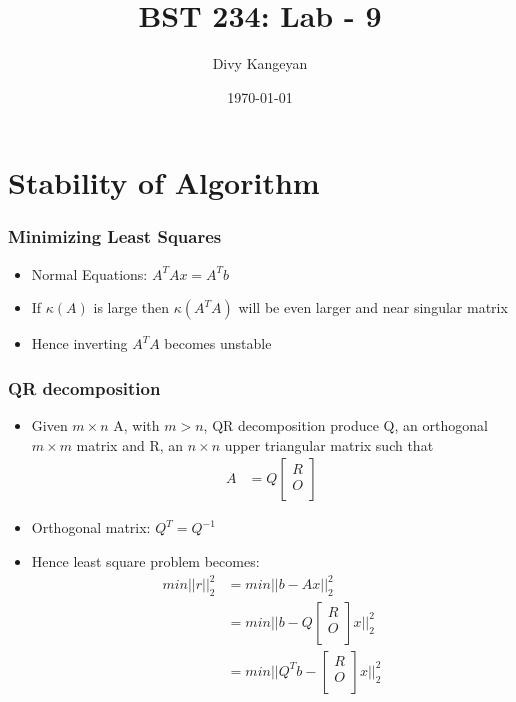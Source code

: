 \documentclass{beamer}
\title[BST 234]{BST 234: Lab - 9}
\author[Divy Kangeyan]{Divy Kangeyan}
\date{\today}
\begin{document}
	
	\begin{frame}
		\titlepage
	\end{frame}
	
	
\section{Stability of Algorithm}




\begin{frame}
\frametitle{Minimizing Least Squares}

\begin{itemize}
\item Normal Equations: $A^TAx = A^Tb$
\item If $\kappa(A)$ is large then $\kappa(A^TA)$ will be even larger and near singular matrix
\item Hence inverting $A^TA$ becomes unstable
\end{itemize}

\end{frame}


\begin{frame}
\frametitle{QR decomposition}

\begin{itemize}
\item Given $m \times n$ A, with $m > n$, QR decomposition produce Q, an orthogonal $m \times m$ matrix and R, an $n \times n$ upper triangular matrix such that
   \begin{align}
    A &= Q \begin{bmatrix}
           R \\
           O \\
         \end{bmatrix}
  \end{align}
\item Orthogonal matrix: $Q^T = Q^{-1}$
\item Hence least square problem becomes:
\begin{align}
min ||r||^2_2 &=min  ||b - Ax||^2_2\\
&= min ||b - Q \begin{bmatrix}
           R \\
           O \\
         \end{bmatrix}x ||^2_2\\
&=min ||Q^Tb - \begin{bmatrix}
           R \\
           O \\
         \end{bmatrix}x ||^2_2
\end{align}
\end{itemize}

\end{frame}
\end{document}
